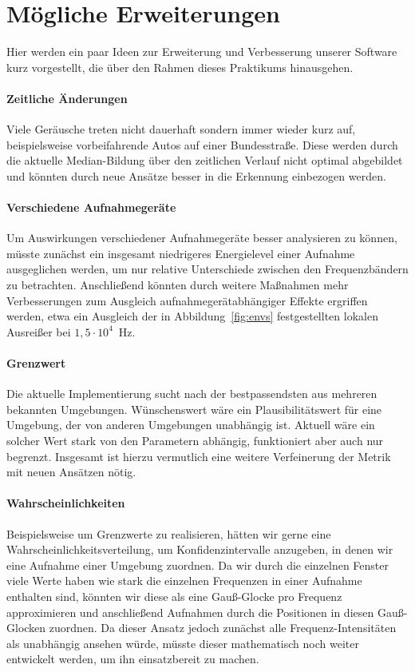 \documentclass[
	fontsize=10.5pt,
	marginpar=false,
	ngerman,
	accentcolor=3d
	]{tudapub}
\begin{document}
\pagebreak
\section{Mögliche Erweiterungen}
\label{future}

Hier werden ein paar Ideen zur Erweiterung und Verbesserung unserer Software kurz vorgestellt, die über den Rahmen dieses Praktikums hinausgehen.

\paragraph{Zeitliche Änderungen}
Viele Geräusche treten nicht dauerhaft sondern immer wieder kurz auf, beispielsweise vorbeifahrende Autos auf einer Bundesstraße. Diese werden durch die aktuelle Median-Bildung über den zeitlichen Verlauf nicht optimal abgebildet und könnten durch neue Ansätze besser in die Erkennung einbezogen werden.

\paragraph{Verschiedene Aufnahmegeräte}
Um Auswirkungen verschiedener Aufnahmegeräte besser analysieren zu können, müsste zunächst ein insgesamt niedrigeres Energielevel einer Aufnahme ausgeglichen werden, um nur relative Unterschiede zwischen den Frequenzbändern zu betrachten. Anschließend könnten durch weitere Maßnahmen mehr Verbesserungen zum Ausgleich aufnahmegerätabhängiger Effekte ergriffen werden, etwa ein Ausgleich der in Abbildung~\ref{fig:envs} festgestellten lokalen Ausreißer bei $1,5\cdot10^4$~Hz.

\paragraph{Grenzwert}
Die aktuelle Implementierung sucht nach der bestpassendsten aus mehreren bekannten Umgebungen. Wünschenswert wäre ein Plausibilitätswert für eine Umgebung, der von anderen Umgebungen unabhängig ist. Aktuell wäre ein solcher Wert stark von den Parametern abhängig, funktioniert aber auch nur begrenzt. Insgesamt ist hierzu vermutlich eine weitere Verfeinerung der Metrik mit neuen Ansätzen nötig.

\paragraph{Wahrscheinlichkeiten}
Beispielsweise um Grenzwerte zu realisieren, hätten wir gerne eine Wahrscheinlichkeitsverteilung, um Konfidenzintervalle anzugeben, in denen wir eine Aufnahme einer Umgebung zuordnen. Da wir durch die einzelnen Fenster viele Werte haben wie stark die einzelnen Frequenzen in einer Aufnahme enthalten sind, könnten wir diese als eine Gauß-Glocke pro Frequenz approximieren und anschließend Aufnahmen durch die Positionen in diesen Gauß-Glocken zuordnen. Da dieser Ansatz jedoch zunächst alle Frequenz-Intensitäten als unabhängig ansehen würde, müsste dieser mathematisch noch weiter entwickelt werden, um ihn einsatzbereit zu machen.
\end{document}

